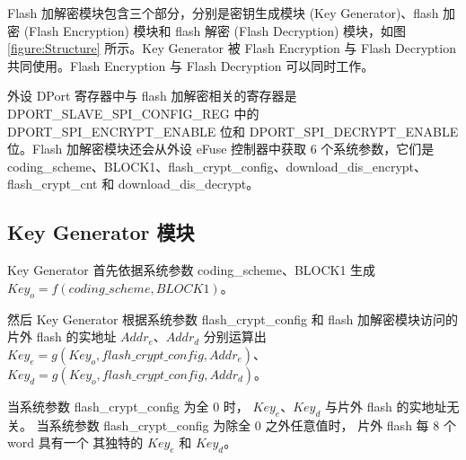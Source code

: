 \documentclass[main\_\_CN.tex]{subfiles}
\begin{document}
Flash 加解密模块包含三个部分，分别是密钥生成模块 (Key Generator)、flash 加密 (Flash Encryption) 模块和 flash 解密 (Flash Decryption) 模块，如图 \ref{figure:Structure} 所示。Key Generator 被 Flash Encryption 与 Flash Decryption 共同使用。Flash Encryption 与 Flash Decryption 可以同时工作。

外设 DPort 寄存器中与 flash 加解密相关的寄存器是 DPORT\_SLAVE\_SPI\_CONFIG\_REG 中的
DPORT\_SPI\_ENCRYPT\_ENABLE 位和 DPORT\_SPI\_DECRYPT\_ENABLE 位。Flash 加解密模块还会从外设 eFuse 控制器中获取 6 个系统参数，它们是 coding\_scheme、BLOCK1、flash\_crypt\_config、download\_dis\_encrypt、flash\_crypt\_cnt 和 download\_dis\_decrypt。


\subsection{Key Generator 模块}

Key Generator 首先依据系统参数 coding\_scheme、BLOCK1 生成\\
\begin{math}Key_{o} = f( coding\_scheme, BLOCK1 )\end{math}。

然后 Key Generator 根据系统参数 flash\_crypt\_config 和 flash 加解密模块访问的片外 flash 的实地址 \begin{math}Addr_{e}\end{math}、\begin{math}Addr_{d}\end{math} 分别运算出\\
\begin{math}Key_{e} = g( Key_{o}, flash\_crypt\_config, Addr_{e} )\end{math}、\\
\begin{math}Key_{d} = g( Key_{o}, flash\_crypt\_config, Addr_{d} )\end{math}。

当系统参数 flash\_crypt\_config 为全 0 时，
\begin{math}Key_{e}\end{math}、\begin{math}Key_{d}\end{math}
与片外 flash 的实地址无关。
当系统参数 flash\_crypt\_config 为除全 0 之外任意值时，
片外 flash 每 8 个 word 具有一个
其独特的 \begin{math}Key_{e}\end{math} 和 \begin{math}Key_{d}\end{math}。
\end{document}
